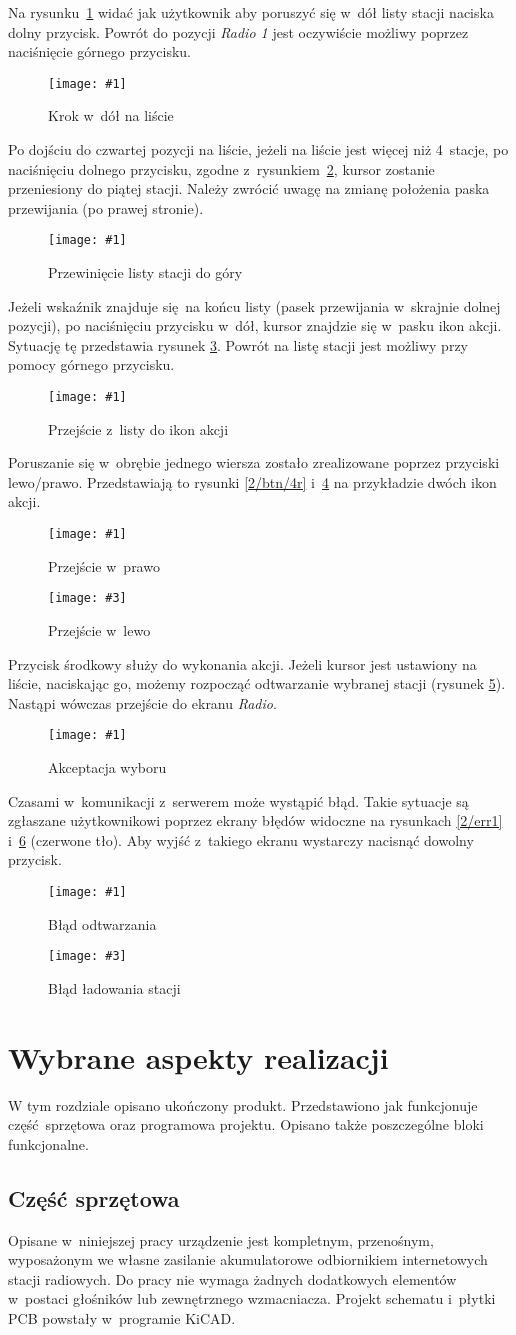 \documentclass[polish]{aghengthesis}
\newcommand{\imgint}[4]{
	\begin{figure}[{#4}]
		\centering
		\texttt{[image: \#1]}
		\caption{#2}
		\label{#1}
	\end{figure}
}
\newcommand{\imgh}[3]{\imgint{#1}{#2}{#3}{H}}
\newcommand{\imgintss}[5]{
	\begin{figure}[{#5}]
		\centering
		\begin{minipage}{.45\textwidth}
			\centering
			\texttt{[image: \#1]}
			\caption{#2}
			\label{#1}
		\end{minipage}%
		\hfill
		\begin{minipage}{.45\textwidth}
			\centering
			\texttt{[image: \#3]}
			\caption{#4}
			\label{#3}
		\end{minipage}
	\end{figure}
}
\newcommand{\imghss}[4]{\imgintss{#1}{#2}{#3}{#4}{H}}
\begin{document}
		Na rysunku~\ref{2/btn/1} widać jak użytkownik aby poruszyć się w~dół listy stacji naciska dolny przycisk. Powrót do pozycji \textit{Radio 1} jest oczywiście możliwy poprzez naciśnięcie górnego przycisku.
		\imgh{2/btn/1}{Krok w~dół na liście}{0.7}
		
		Po dojściu do czwartej pozycji na liście, jeżeli na liście jest więcej niż 4~stacje, po naciśnięciu dolnego przycisku, zgodne z~rysunkiem~\ref{2/btn/2}, kursor zostanie przeniesiony do piątej stacji. Należy zwrócić uwagę na zmianę położenia paska przewijania (po prawej stronie).
		\imgh{2/btn/2}{Przewinięcie listy stacji do góry}{0.7}
		
		Jeżeli wskaźnik znajduje się na końcu listy (pasek przewijania w~skrajnie dolnej pozycji), po naciśnięciu przycisku w~dół, kursor znajdzie się w~pasku ikon akcji. Sytuację tę przedstawia rysunek \ref{2/btn/3}. Powrót na listę stacji jest możliwy przy pomocy górnego przycisku.
		\imgh{2/btn/3}{Przejście z~listy do ikon akcji}{0.7}
		
		Poruszanie się w~obrębie jednego wiersza zostało zrealizowane poprzez przyciski \mbox{lewo/prawo}. Przedstawiają to rysunki \ref{2/btn/4r} i~\ref{2/btn/4l} na przykładzie dwóch ikon akcji.
		\imghss{2/btn/4r}{Przejście w~prawo}{2/btn/4l}{Przejście w~lewo}
		
		Przycisk środkowy służy do wykonania akcji. Jeżeli kursor jest ustawiony na liście, naciskając go, możemy rozpocząć odtwarzanie wybranej stacji (rysunek \ref{2/btn/5}). Nastąpi wówczas przejście do ekranu \textit{Radio}.
		\imgh{2/btn/5}{Akceptacja wyboru}{0.7}
				
		Czasami w~komunikacji z~serwerem może wystąpić błąd. Takie sytuacje są zgłaszane użytkownikowi poprzez ekrany błędów widoczne na rysunkach \ref{2/err1} i~\ref{2/err2} (czerwone tło). Aby wyjść z~takiego ekranu wystarczy nacisnąć dowolny przycisk.
		\imghss{2/err1}{Błąd odtwarzania}{2/err2}{Błąd ładowania stacji}

\cleardoublepage
\chapter{Wybrane aspekty realizacji}
	W tym rozdziale opisano ukończony produkt.
	Przedstawiono jak funkcjonuje część sprzętowa oraz programowa projektu. Opisano także poszczególne bloki funkcjonalne.
	
	\section{Część sprzętowa}
		\label{sec:hw}
		Opisane w~niniejszej pracy urządzenie jest kompletnym, przenośnym, wyposażonym we własne zasilanie akumulatorowe  odbiornikiem internetowych stacji radiowych. Do pracy nie wymaga żadnych dodatkowych elementów w~postaci głośników lub zewnętrznego wzmacniacza.
		Projekt schematu i~płytki PCB powstały w~programie KiCAD\textsuperscript{\cite{hw_kicad}}.
	
\end{document}
